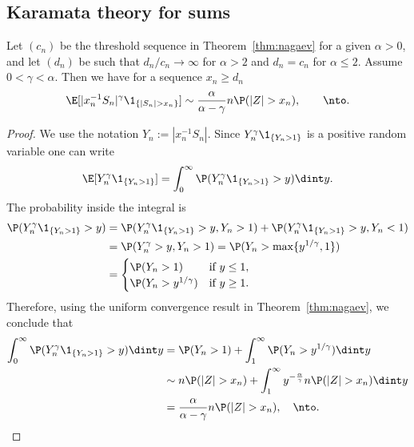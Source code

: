 \subsection{Karamata theory for sums}
\begin{proposition}\label{prop:karasumsbeta}
Let $(c_n)$ be the threshold sequence in Theorem~\ref{thm:nagaev} for a
given $\alpha>0$,  and let $(d_n)$ be such that
$d_n/c_n\to\infty$ for $\alpha>2$ and $d_n=c_n$ for $\alpha\le 2$. Assume $0<\gamma< \alpha$.
Then we have for a sequence $x_n\ge d_n$
\begin{equation}
\E[|x_n^{-1} S_n|^\gamma \1_{\{|S_n|>x_n\}}] \sim \frac{\alpha}{\alpha -\gamma} n \P(|Z|>x_n), \qquad \nto.
\end{equation}
\end{proposition}
\begin{proof}
We use the notation $Y_n:=|x_n^{-1} S_n|$. Since $Y_n^\gamma \1_{\{Y_n>1\}}$ is a positive random variable one can write 
\begin{equation*}
\E[Y_n^\gamma \1_{\{Y_n>1\}}]=\int_0^\infty \P(Y_n^\gamma \1_{\{Y_n>1\}}>y) \dint y.
\end{equation*}
The probability inside the integral is 
\begin{equation*}
\begin{split}
\P(Y_n^\gamma\1_{\{Y_n>1\}}>y) &= \P(Y_n^\gamma \1_{\{Y_n>1\}}>y, Y_n>1)+\P(Y_n^\gamma \1_{\{Y_n>1\}}>y, Y_n<1)\\
&=\P(Y_n^\gamma >y, Y_n>1)= \P(Y_n > \max \{ y^{1/\gamma},1\})\\
&= \begin{cases}
\P(Y_n>1) & \text{if } y\le 1,\\ 
\P(Y_n>y^{1/\gamma}) & \text{if } y\ge 1.
\end{cases}
\end{split}
\end{equation*}
Therefore, using the uniform convergence result in Theorem~\ref{thm:nagaev}, we conclude that
\begin{equation*}
\begin{split}
\int_0^\infty \P(Y_n^\gamma \1_{\{Y_n>1\}}>y) \dint y &= \P(Y_n>1) + \int_1^\infty \P(Y_n>y^{1/\gamma}) \dint y\\
&\sim n \P(|Z|>x_n)+\int_1^\infty y^{-\frac{\alpha}{\gamma}} n \P(|Z|>x_n) \dint y\\
&= \frac{\alpha}{\alpha -\gamma} n \P(|Z|>x_n), \quad \nto.
\end{split}
\end{equation*}
\end{proof}

